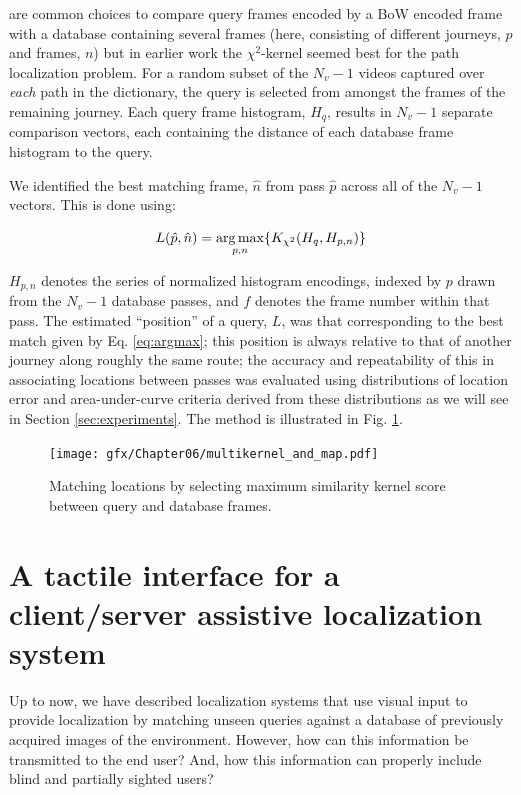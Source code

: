 are common choices to compare query frames encoded by a BoW encoded frame with a database containing several frames (here, consisting of different journeys, $p$ and frames, $n$) but in earlier work \citep{Rivera-Rubio2015PRL} the $\chi^2$-kernel seemed best for the path localization problem.  For a random subset of the $N_v-1$ videos captured over {\em each} path in the dictionary, the query is selected from amongst the frames of the remaining journey.   Each query frame histogram, $H_q$, results in $N_v-1$ separate comparison vectors, each containing the distance of each database frame histogram to the query. 


We identified the best matching frame, $\hat{n}$ from pass $\hat{p}$ across all of the $N_v-1$ vectors.  This is done using: 

\begin{equation}
\centering
L(\hat{p},\hat{n}) = \underset{p,n}{\arg \max} \lbrace K_{\chi^2}(H_q,H_{p,n})\rbrace
\label{eq:argmax}
\end{equation}


$H_{p,n}$ denotes the series of normalized histogram encodings, indexed by $p$ drawn from the $N_v-1$ database passes, and $f$ denotes the frame number within that pass.  The estimated ``position'' of a query, $L$, was that corresponding to the best match given by Eq. \ref{eq:argmax}; this position is always relative to that of another journey along roughly the same route; the accuracy and repeatability of this in associating locations between passes was evaluated using distributions of location error and area-under-curve criteria derived from these distributions as we will see in Section \ref{sec:experiments}. The method is illustrated in Fig. \ref{fig:matching from kernels}.

\begin{figure}
\centering
\texttt{[image: gfx/Chapter06/multikernel\_and\_map.pdf]}
\caption{Matching locations by selecting maximum similarity kernel score between query and database frames.}
\label{fig:matching from kernels}
\end{figure}



\section{A tactile interface for a client/server assistive localization system}
\label{sec:tactile}
Up to now, we have described localization systems that use visual input to provide localization by matching unseen queries against a database of previously acquired images of the environment. However, how can this information be transmitted to the end user? And, how this information can properly include blind and partially sighted users?

